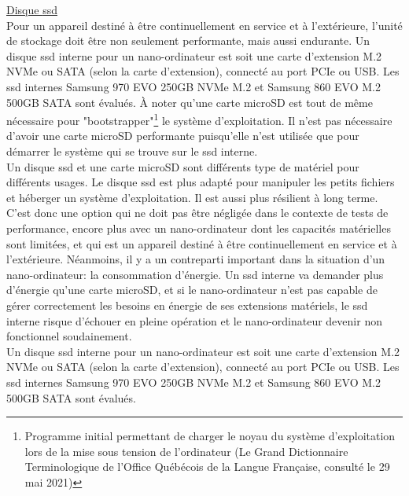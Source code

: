 \par\underline{Disque \acrshort{ssd}}
\vspace{\baselineskip}
\\
\noindent Pour un appareil destiné à être continuellement en service et à l'extérieure, l'unité de stockage doit être non seulement performante, mais aussi endurante. Un disque \acrshort{ssd} interne pour un nano-ordinateur est soit une carte d'extension M.2 NVMe ou SATA (selon la carte d'extension), connecté au port PCIe ou USB. Les \acrshort{ssd} internes Samsung 970 EVO 250GB NVMe M.2 et Samsung 860 EVO M.2 500GB SATA sont évalués. À noter qu'une carte microSD est tout de même nécessaire pour "bootstrapper"\footnote{Programme initial permettant de charger le noyau du système d'exploitation lors de la mise sous tension de l'ordinateur (Le Grand Dictionnaire Terminologique de l'Office Québécois de la Langue Française, consulté le 29 mai 2021)} le système d'exploitation. Il n'est pas nécessaire d'avoir une carte microSD performante puisqu'elle n'est utilisée que pour démarrer le système qui se trouve sur le \acrshort{ssd} interne. 
\vspace{\baselineskip}
\\
\noindent Un disque \acrshort{ssd} et une carte microSD sont différents type de matériel pour différents usages. Le disque \acrshort{ssd} est plus adapté pour manipuler les petits fichiers et héberger un système d'exploitation. Il est aussi plus résilient à long terme. C'est donc une option qui ne doit pas être négligée dans le contexte de tests de performance, encore plus avec un nano-ordinateur dont les capacités matérielles sont limitées, et qui est un appareil destiné à être continuellement en service et à l'extérieure. Néanmoins, il y a un contreparti important dans la situation d'un nano-ordinateur: la consommation d'énergie. Un \acrshort{ssd} interne va demander plus d'énergie qu'une carte microSD, et si le nano-ordinateur n'est pas capable de gérer correctement les besoins en énergie de ses extensions matériels, le \acrshort{ssd} interne risque d'échouer en pleine opération et le nano-ordinateur devenir non fonctionnel soudainement.
\vspace{\baselineskip}
\\
\noindent Un disque \acrshort{ssd} interne pour un nano-ordinateur est soit une carte d'extension M.2 NVMe ou SATA (selon la carte d'extension), connecté au port PCIe ou USB. Les \acrshort{ssd} internes Samsung 970 EVO 250GB NVMe M.2 et Samsung 860 EVO M.2 500GB SATA sont évalués.
